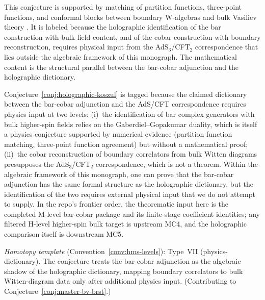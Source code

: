 \begin{remark}
This conjecture is supported by matching of partition functions,
three-point functions, and conformal blocks between boundary W-algebras
and bulk Vasiliev theory \cite{GG11}. It is labeled
\ClaimStatusConjectured{} because the holographic identification of the
bar construction with bulk field content, and of the cobar construction
with boundary reconstruction, requires physical input from the
AdS$_3$/CFT$_2$ correspondence that lies outside the algebraic framework
of this monograph.  The mathematical content is the structural parallel
between the bar-cobar adjunction and the holographic dictionary.
\end{remark}

\begin{remark}[Scope]
Conjecture~\ref{conj:holographic-koszul} is tagged \ClaimStatusConjectured{}
because the claimed dictionary between the bar-cobar adjunction and the
AdS/CFT correspondence requires physics input at two levels:
(i)~the identification of bar complex generators with bulk higher-spin
fields relies on the Gaberdiel--Gopakumar duality, which is itself a
physics conjecture supported by numerical evidence (partition function
matching, three-point function agreement) but without a mathematical proof;
(ii)~the cobar reconstruction of boundary correlators from bulk Witten
diagrams presupposes the AdS$_3$/CFT$_2$ correspondence, which is not a
theorem.  Within the algebraic framework of this monograph, one can prove
that the bar-cobar adjunction has the same formal structure as the
holographic dictionary, but the identification of the two requires external
physical input that we do not attempt to supply.  In the repo's frontier
order, the theorematic input here is the completed M-level bar-cobar
package and its finite-stage coefficient identities; any filtered H-level
higher-spin bulk target is upstream MC4, and the holographic comparison
itself is downstream MC5.

\emph{Homotopy template} (Convention~\ref{conv:hms-levels}): Type~VII (physics-dictionary).
The conjecture treats the bar-cobar adjunction as the algebraic shadow
of the holographic dictionary, mapping boundary correlators to bulk
Witten-diagram data only after additional physics input.
(Contributing to Conjecture~\ref{conj:master-bv-brst}.)
\end{remark}
